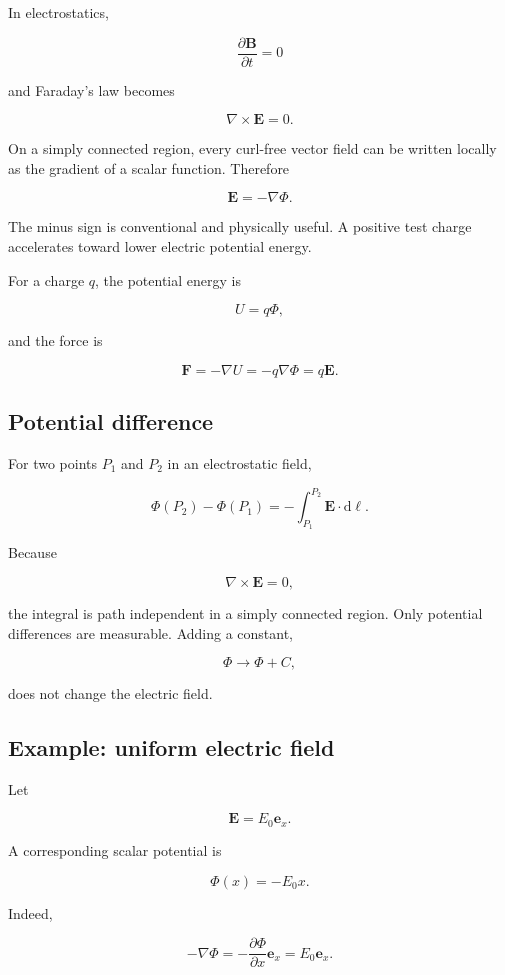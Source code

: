 In electrostatics,

\[
\frac{\partial\mathbf{B}}{\partial t}=0
\]

and Faraday's law becomes

\[
\nabla\times\mathbf{E}=0.
\]

On a simply connected region, every curl-free vector field can be written locally as the gradient of a scalar function. Therefore

\[
\boxed{
\mathbf{E}
=
-\nabla\Phi
}.
\]

The minus sign is conventional and physically useful. A positive test charge accelerates toward lower electric potential energy.

For a charge \(q\), the potential energy is

\[
U=q\Phi,
\]

and the force is

\[
\mathbf{F}
=
-\nabla U
=
-q\nabla\Phi
=
q\mathbf{E}.
\]

\subsection{Potential difference}

For two points \(P_1\) and \(P_2\) in an electrostatic field,

\[
\Phi(P_2)-\Phi(P_1)
=
-\int_{P_1}^{P_2}
\mathbf{E}\cdot\mathrm{d}\boldsymbol{\ell}.
\]

Because

\[
\nabla\times\mathbf{E}=0,
\]

the integral is path independent in a simply connected region. Only potential differences are measurable. Adding a constant,

\[
\Phi
\longrightarrow
\Phi+C,
\]

does not change the electric field.

\subsection{Example: uniform electric field}

Let

\[
\mathbf{E}
=
E_0\mathbf{e}_x.
\]

A corresponding scalar potential is

\[
\boxed{
\Phi(x)
=
-E_0x
}.
\]

Indeed,

\[
-\nabla\Phi
=
-\frac{\partial\Phi}{\partial x}
\mathbf{e}_x
=
E_0\mathbf{e}_x.
\]

